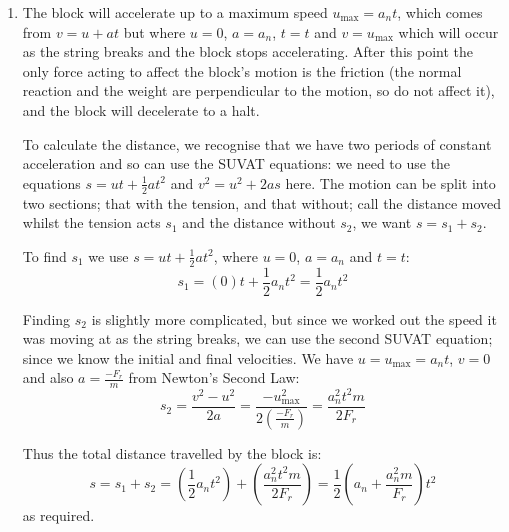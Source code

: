 \begin{problem}[A1987PSIIQ9a]
{\begin{enumerate}
	\item The block will accelerate up to a maximum speed $u_{\textrm{max}} = a_{n}t$, which comes from $v= u + at$ but where $u = 0$, $a = a_{n}$, $t=t$ and $ v = u_{\textrm{max}}$ which will occur as the string breaks and the block stops accelerating. After this point the only force acting to affect the block's motion is the friction (the normal reaction and the weight are perpendicular to the motion, so do not affect it), and the block will decelerate to a halt.

To calculate the distance, we recognise that we have two periods of constant acceleration and so can use the SUVAT equations: we need to use the equations $s = ut + \frac{1}{2}at^{2}$ and $v^{2} = u^{2} + 2as$ here. The motion can be split into two sections; that with the tension, and that without; call the distance moved whilst the tension acts $s_{1}$ and the distance without $s_{2}$, we want $s = s_{1} + s_{2}$.

To find $s_{1}$ we use $s = ut + \frac{1}{2}at^{2}$, where $u = 0$, $a = a_{n}$ and $t = t$:
\begin{equation*} s_{1} = (0)t + \frac{1}{2} a_{n}t^{2} = \frac{1}{2} a_{n}t^{2} \end{equation*}

Finding $s_{2}$ is slightly more complicated, but since we worked out the speed it was moving at as the string breaks, we can use the second SUVAT equation; since we know the initial and final velocities. We have $u = u_{\textrm{max}} = a_{n}t$, $v = 0$ and also $a = \frac{-F_{r}}{m}$ from Newton's Second Law:
\begin{equation*} s_{2} = \frac{v^{2} - u^{2}}{2a} = \frac{- u_{\textrm{max}}^{2}}{2\left( \frac{-F_{r}}{m} \right)} = \frac{a_{n}^{2} t^{2} m}{2 F_{r}} \end{equation*}

Thus the total distance travelled by the block is:
\begin{equation*} s = s_{1} + s_{2} = \left( \frac{1}{2}a_{n}t^2 \right) + \left( \frac{a_{n}^{2}t^{2}m}{2F_{r}} \right) = \frac{1}{2} \left(a_{n} + \frac{a_{n}^{2}m}{F_{r}} \right)t^{2} \end{equation*}
as required.


\end{enumerate}}
\end{problem}
